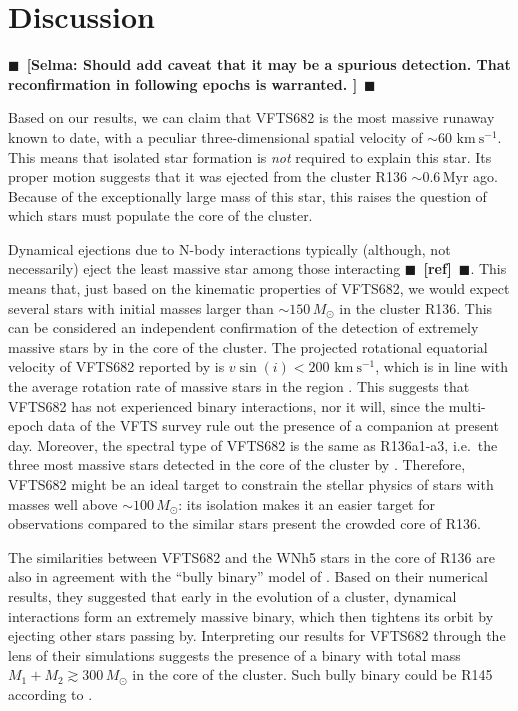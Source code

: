 \documentclass[apjl,twocolumn]{emulateapj}
\newcommand{\todo}[1]{{\large $\blacksquare$~\textbf{\color{red}[#1]}}~$\blacksquare$}
\newcommand{\kms}{{\,\mathrm{km\ s^{-1}}}}
\begin{document}
\section{Discussion}
\label{sec:discussion}
\todo{Selma: Should add caveat that it may be a spurious detection.  That reconfirmation in following epochs is warranted. }

Based on our results, we can claim that VFTS682 is the most massive
runaway known to date, with a peculiar three-dimensional spatial
velocity of $\sim$$60\,\kms$. This means that isolated star formation is
\emph{not} required to explain this star. Its proper motion suggests that it was ejected from the cluster R136
$\sim$$0.6$\,Myr ago. Because of the exceptionally large mass
of this star, this raises the question of which stars must populate
the core of the cluster.

Dynamical ejections due to N-body interactions typically (although, not necessarily) eject the least
massive star among those interacting \todo{ref}. This means that, just
based on the kinematic properties of VFTS682, we would expect several
stars with initial masses larger than $\sim$$150\,M_\odot$ in the
cluster R136.
This can be considered an independent confirmation of the detection
of extremely massive stars by \cite{crowther:10} in the core of the
cluster. The projected rotational equatorial velocity of VFTS682
reported by \cite{schneider:18} is $v\sin(i)<200\,\kms$, which is in
line with the average rotation rate of massive stars in the region
\citep[][]{ramirez-agudelo:15}. This suggests that VFTS682 has not
experienced binary interactions, nor it will, since the multi-epoch
data of the VFTS survey rule out the presence of a companion at
present day. Moreover, the spectral type of VFTS682
\citep[WNh5,][]{bestenlehner:11} is the same as R136a1-a3, i.e.~the
three most massive stars detected in the core of the cluster by
\cite{crowther:10}. Therefore,
VFTS682 might be an ideal target to constrain the stellar physics of
stars with masses well above $\sim100\,M_\odot$: its isolation makes
it an easier target for observations compared to the similar stars present the crowded core of R136.

The similarities between VFTS682 and the WNh5 stars in the core of
R136 are also in agreement with the ``bully binary'' model of
\cite{fujii:11}. Based on their numerical results, they suggested that
early in the evolution of a cluster, dynamical interactions form an extremely
massive binary, which then tightens its orbit by ejecting other stars passing
by. Interpreting our results for VFTS682 through the lens of their simulations
suggests the presence of a binary with total mass
$M_1+M_2\gtrsim 300\,M_\odot$ in the core of the cluster. Such bully
binary could be R145 according to \cite{fujii:11}.
\end{document}
